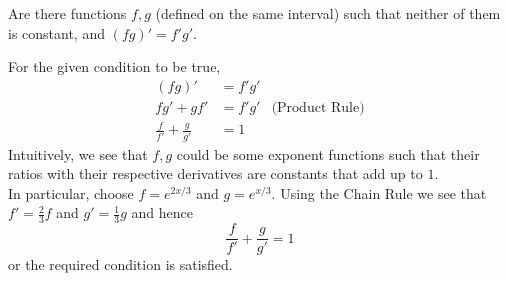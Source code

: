 \documentclass[boxes, qed]{homework}
\begin{document}
\begin{problem}Are there functions $f,g$ (defined on the same interval) such that neither 
  of them is constant, and $(fg)'= f'g'$.
\end{problem}
\begin{solution}For the given condition to be true,
  \begin{align*}
    (fg)'&=f'g'\\
      fg'+gf'&=f'g'
    &\text{(Product Rule)}\\
    \frac{f}{f'}+\frac{g}{g'}&=1
  \end{align*}
  Intuitively, we see that $f,g$ could be some exponent functions
  such that their ratios with their respective derivatives are constants
  that add up to $1$.\\
  In particular, choose $f=e^{2x/3}$ and $g=e^{x/3}$. Using the Chain Rule
  we see that $f'=\frac{2}{3}f$ and $g'=\frac{1}{3}g$ and hence
  $$\frac{f}{f'}+\frac{g}{g'}=1$$ or the required condition is satisfied.
\end{solution}
\end{document}
